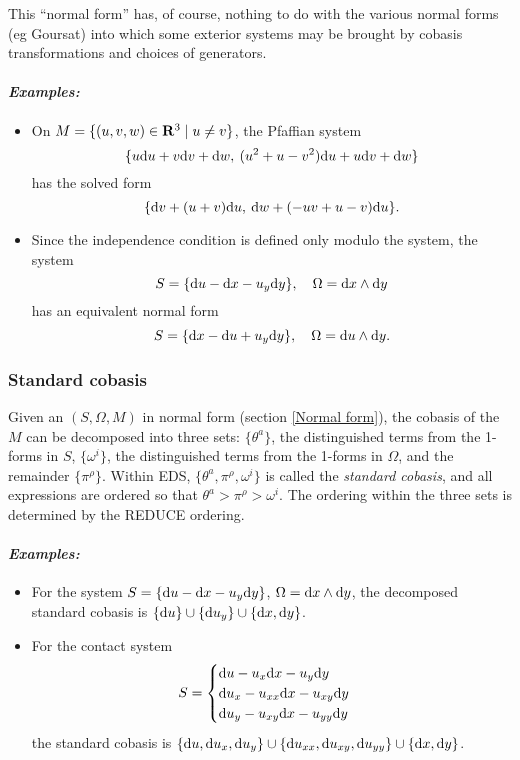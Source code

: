 This ``normal form'' has, of course, nothing to do with the various normal 
forms (eg Goursat) into which some exterior systems may be brought by
cobasis transformations and choices of generators.

\paragraph{\it Examples:}
\begin{itemize}
\item On $M=\{(u,v,w)\in\mathbf{R}^3\mid u\neq v\}$, the Pfaffian system
      \[\{u\mathrm{d} u + v\mathrm{d} v + \mathrm{d} w,\>(u^2 + u - v^2)\mathrm{d} u + u\mathrm{d} v + \mathrm{d} w\}\] has
      the solved form
      \[\{\mathrm{d} v + (u + v)\mathrm{d} u,\>\mathrm{d} w + ( - uv + u - v )\mathrm{d} u\}.\]
\item Since the independence condition is defined only modulo the system,
      the system
      \[S=\{\mathrm{d} u - \mathrm{d} x - u_y\mathrm{d} y\},\quad \Omega=\mathrm{d} x\wedge\mathrm{d} y\] has an
      equivalent normal form
      \[S=\{\mathrm{d} x - \mathrm{d} u + u_y\mathrm{d} y\},\quad \Omega=\mathrm{d} u\wedge\mathrm{d} y.\]
\end{itemize}

\subsubsection{Standard cobasis}
\label{Standard cobasis}

Given an  $(S,\Omega,M)$ in normal form (section \ref{Normal
form}), the cobasis of the  $M$ can be decomposed into three
sets: $\{\theta^a\}$, the distinguished terms from the 1-forms in $S$,
$\{\omega^i\}$, the distinguished terms from the 1-forms in $\Omega$, and
the remainder $\{\pi^\rho\}$. Within EDS, $\{\theta^a,\pi^\rho,\omega^i\}$
is called the {\em standard cobasis}, and all expressions are ordered so
that $\theta^a > \pi^\rho > \omega^i$. The ordering within the three sets
is determined by the REDUCE  ordering.

\paragraph{\it Examples:}
\begin{itemize}
\item For the system $S=\{\mathrm{d} u - \mathrm{d} x - u_y\mathrm{d} y\}$, $\Omega=\mathrm{d} x\wedge\mathrm{d} y$,
      the decomposed standard cobasis is $\{\mathrm{d} u\}\cup\{\mathrm{d} u_y\}\cup\{\mathrm{d}
      x,\mathrm{d} y\}$.
\item For the contact system 
  \[S=\begin{cases}
                \mathrm{d} u - u_x\mathrm{d} x - u_y\mathrm{d} y\\
                \mathrm{d} u_x - u_{xx}\mathrm{d} x - u_{xy}\mathrm{d} y\\
                \mathrm{d} u_y - u_{xy}\mathrm{d} x - u_{yy}\mathrm{d} y
       \end{cases}\]
      the standard cobasis is $\{\mathrm{d} u,\mathrm{d} u_x,\mathrm{d} u_y\}\cup\{\mathrm{d}
      u_{xx},\mathrm{d} u_{xy},\mathrm{d} u_{yy}\}\cup\{\mathrm{d} x,\mathrm{d} y\}$.

\end{itemize}


